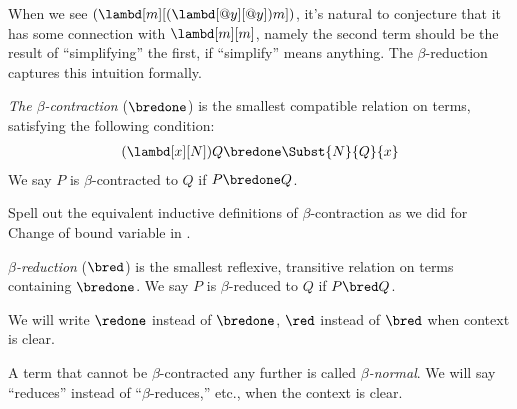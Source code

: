 \documentclass[../../../include/open-logic-section]{subfiles}
\begin{document}

When we see $(\lambd[m][(\lambd[@y][@y]) m])$, it's natural to
conjecture that it has some connection with $\lambd[m][m]$,
namely the second term should be the result of ``simplifying'' the first, if
``simplify'' means anything. The $\beta$-reduction captures this
intuition formally.

\begin{defn} 
  \emph{The $\beta$-contraction} ($\bredone$) is the smallest compatible
  relation on terms, satisfying the following condition:
  \begin{align*}
    (\lambd[x][N])Q \bredone \Subst{N}{Q}{x} 
  \end{align*}
  We say $P$ is $\beta$-contracted to $Q$ if $P \bredone Q$. 
\end{defn}

\begin{prob} 
  Spell out the equivalent inductive definitions of $\beta$-contraction as we
  did for Change of bound variable in .
\end{prob}
  
\begin{defn} 
  \emph{$\beta$-reduction} ($\bred$) is the smallest reflexive, transitive
  relation on terms containing $\bredone$.
  We say $P$ is $\beta$-reduced to $Q$ if $P \bred Q$.
\end{defn}
We will write $\redone$ instead of $\bredone$, $\red$ instead of
$\bred$ when context is clear.

\begin{defn}
A term that cannot be $\beta$-contracted any further is called 
\emph{$\beta$-normal}. We will say ``reduces'' instead of ``$\beta$-reduces,''
etc., when the context is clear.
\end{defn}
\end{document}
